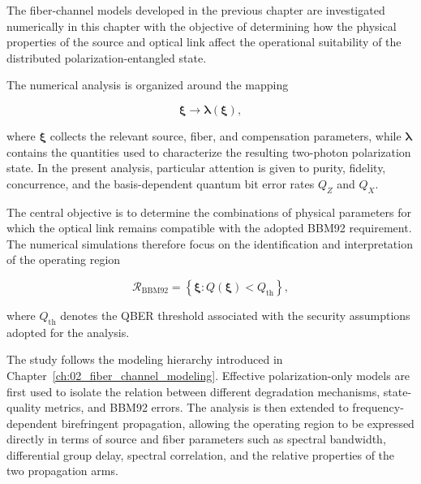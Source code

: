 
The fiber-channel models developed in the previous chapter are investigated
numerically in this chapter with the objective of determining how the physical
properties of the source and optical link affect the operational suitability of
the distributed polarization-entangled state.

The numerical analysis is organized around the mapping

\begin{equation}
\boxed{
\boldsymbol{\xi}
\longrightarrow
\boldsymbol{\lambda}(\boldsymbol{\xi}),
}
\label{eq:chapter3_physical_operational_mapping}
\end{equation}

where \(\boldsymbol{\xi}\) collects the relevant source, fiber, and compensation
parameters, while \(\boldsymbol{\lambda}\) contains the quantities used to
characterize the resulting two-photon polarization state. In the present
analysis, particular attention is given to purity, fidelity, concurrence, and
the basis-dependent quantum bit error rates \(Q_Z\) and \(Q_X\).

The central objective is to determine the combinations of physical parameters
for which the optical link remains compatible with the adopted BBM92
requirement. The numerical simulations therefore focus on the identification
and interpretation of the operating region

\begin{equation}
\boxed{
\mathcal{R}_{\mathrm{BBM92}}
=
\left\{
\boldsymbol{\xi}
:
Q(\boldsymbol{\xi})
<
Q_{\mathrm{th}}
\right\},
}
\label{eq:chapter3_bbm92_operating_region}
\end{equation}

where \(Q_{\mathrm{th}}\) denotes the QBER threshold associated with the security
assumptions adopted for the analysis.

The study follows the modeling hierarchy introduced in
Chapter~\ref{ch:02_fiber_channel_modeling}. Effective polarization-only models
are first used to isolate the relation between different degradation mechanisms,
state-quality metrics, and BBM92 errors. The analysis is then extended to
frequency-dependent birefringent propagation, allowing the operating region to
be expressed directly in terms of source and fiber parameters such as spectral
bandwidth, differential group delay, spectral correlation, and the relative
properties of the two propagation arms.

